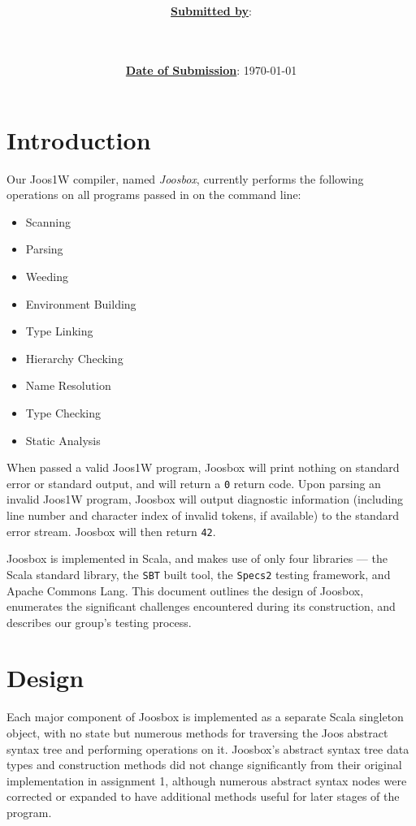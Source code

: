 \documentclass[letterpaper]{article}
\title{\course \\ \term \\ \project}
\date{\ul{\textbf{Date of Submission}}: \today}
\author{\ul{\textbf{Submitted by}}: \\ \indent \wenhao \\ \indent \chris \\ \indent \peter}
\begin{document}
  \maketitle
  \thispagestyle{empty}
  \clearpage

  \setcounter{page}{1}

  \clearpage
  \section{Introduction}

  Our Joos1W compiler, named {\em Joosbox}, currently performs the following
  operations on all programs passed in on the command line:

  \begin{itemize}
    \item Scanning
    \item Parsing
    \item Weeding
    \item Environment Building
    \item Type Linking
    \item Hierarchy Checking
    \item Name Resolution
    \item Type Checking
    \item Static Analysis
  \end{itemize}

  When passed a valid Joos1W program, Joosbox will print nothing on standard
  error or standard output, and will return a {\tt 0} return code. Upon
  parsing an invalid Joos1W program, Joosbox will output diagnostic
  information (including line number and character index of invalid tokens, if
  available) to the standard error stream. Joosbox will then return {\tt 42}.

  Joosbox is implemented in Scala, and makes use of only four libraries ---
  the Scala standard library, the {\tt SBT} built tool, the {\tt Specs2}
  testing framework, and Apache Commons Lang. This document outlines the
  design of Joosbox, enumerates the significant challenges encountered during
  its construction, and describes our group's testing process.

  \section{Design}

  Each major component of Joosbox is implemented as a separate Scala singleton
  object, with no state but numerous methods for traversing the Joos abstract
  syntax tree and performing operations on it. Joosbox's abstract syntax tree
  data types and construction methods did not change significantly from their
  original implementation in assignment 1, although numerous abstract syntax
  nodes were corrected or expanded to have additional methods useful for later
  stages of the program.
\end{document}
